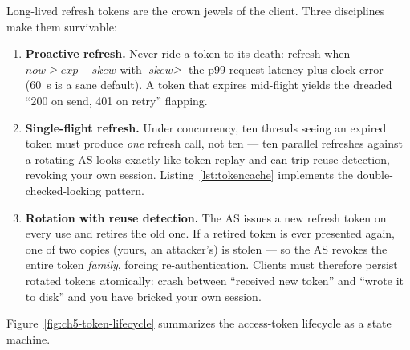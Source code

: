 Long-lived refresh tokens are the crown jewels of the client. Three
disciplines make them survivable:

\begin{enumerate}
  \item \textbf{Proactive refresh.} Never ride a token to its death: refresh
        when $\textit{now} \ge \textit{exp} - \textit{skew}$ with
        $\textit{skew} \ge$ the p99 request latency plus clock error
        (60~s is a sane default). A token that expires mid-flight yields the
        dreaded ``200 on send, 401 on retry'' flapping.
  \item \textbf{Single-flight refresh.} Under concurrency, ten threads
        seeing an expired token must produce \emph{one} refresh call, not
        ten --- ten parallel refreshes against a rotating AS looks exactly
        like token replay and can trip reuse detection, revoking your own
        session. Listing~\ref{lst:tokencache} implements the
        double-checked-locking pattern.
  \item \textbf{Rotation with reuse detection.} The AS issues a new refresh
        token on every use and retires the old one. If a retired token is
        ever presented again, one of two copies (yours, an attacker's) is
        stolen --- so the AS revokes the entire token \emph{family}, forcing
        re-authentication. Clients must therefore persist rotated tokens
        atomically: crash between ``received new token'' and ``wrote it to
        disk'' and you have bricked your own session.
\end{enumerate}

Figure~\ref{fig:ch5-token-lifecycle} summarizes the access-token lifecycle
as a state machine.

